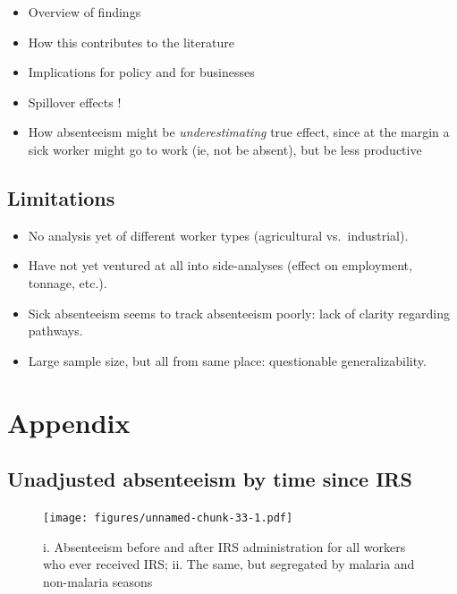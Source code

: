 \documentclass[]{article}
\providecommand{\tightlist}{%
  \setlength{\itemsep}{0pt}\setlength{\parskip}{0pt}}
\begin{document}

\begin{itemize}
\tightlist
\item
  Overview of findings
\item
  How this contributes to the literature
\item
  Implications for policy and for businesses
\item
  Spillover effects !
\item
  How absenteeism might be \emph{underestimating} true effect, since at
  the margin a sick worker might go to work (ie, not be absent), but be
  less productive
\end{itemize}

\subsection{Limitations}\label{limitations}

\begin{itemize}
\tightlist
\item
  No analysis yet of different worker types (agricultural
  vs.~industrial).
\item
  Have not yet ventured at all into side-analyses (effect on employment,
  tonnage, etc.).
\item
  Sick absenteeism seems to track absenteeism poorly: lack of clarity
  regarding pathways.
\item
  Large sample size, but all from same place: questionable
  generalizability.
\end{itemize}

\newpage

\section{Appendix}\label{appendix}

\subsection{Unadjusted absenteeism by time since
IRS}\label{unadjusted-absenteeism-by-time-since-irs}

\begin{figure}
\centering
\texttt{[image: figures/unnamed-chunk-33-1.pdf]}
\caption{i. Absenteeism before and after IRS administration for all
workers who ever received IRS; ii. The same, but segregated by malaria
and non-malaria seasons}
\end{figure}
\end{document}
